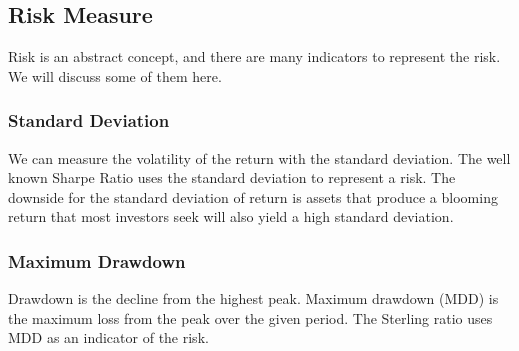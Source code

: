 \subsection{Risk Measure}
Risk is an abstract concept, and there are many indicators to represent the risk. We will discuss some of them here. 
\subsubsection{Standard Deviation}
We can measure the volatility of the return with the standard deviation. The well known Sharpe Ratio uses the standard deviation to represent a risk. The downside for the standard deviation of return is assets that produce a blooming return that most investors seek will also yield a high standard deviation.
\subsubsection{Maximum Drawdown}
Drawdown is the decline from the highest peak. Maximum drawdown (MDD) is the maximum loss from the peak over the given period. The Sterling ratio uses MDD as an indicator of the risk.